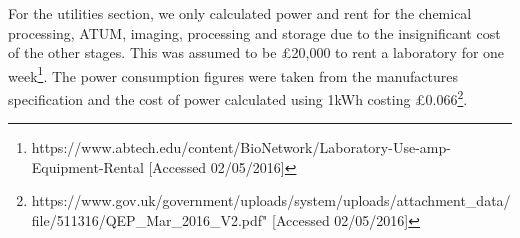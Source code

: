 \documentclass[a4paper, 11pt]{article}
\numberwithin{equation}{section}
\begin{document}
For the utilities section, we only calculated power and rent for the chemical processing, ATUM, imaging, processing and storage due to the insignificant cost of the other stages. This was assumed to be \pounds 20,000 to rent a laboratory for one week\footnote{https://www.abtech.edu/content/BioNetwork/Laboratory-Use-amp-Equipment-Rental [Accessed 02/05/2016]}. The power consumption figures were taken from the manufactures specification and the cost of power calculated using 1kWh costing \pounds 0.066\footnote{https://www.gov.uk/government/uploads/system/uploads/attachment\_data/file/511316/QEP\_Mar\_2016\_V2.pdf" [Accessed 02/05/2016]}.


\begin{table}[H]
\centering
{}
\end{table}
\end{document}
